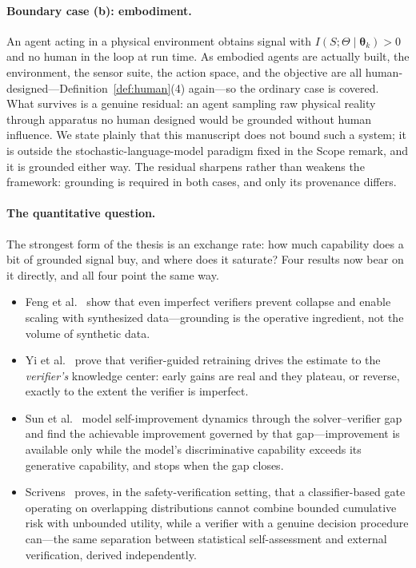 \documentclass[11pt,a4paper]{article}
\begin{document}
\paragraph{Boundary case (b): embodiment.} An agent acting in a physical environment obtains signal with $I(S;\Theta \mid \bm{\theta}_k) > 0$ and no human in the loop at run time. As embodied agents are actually built, the environment, the sensor suite, the action space, and the objective are all human-designed---Definition~\ref{def:human}(4) again---so the ordinary case is covered. What survives is a genuine residual: an agent sampling raw physical reality through apparatus no human designed would be grounded without human influence. We state plainly that this manuscript does not bound such a system; it is outside the stochastic-language-model paradigm fixed in the Scope remark, and it is grounded either way. The residual sharpens rather than weakens the framework: grounding is required in both cases, and only its provenance differs.

\paragraph{The quantitative question.} The strongest form of the thesis is an exchange rate: how much capability does a bit of grounded signal buy, and where does it saturate? Four results now bear on it directly, and all four point the same way.

\begin{itemize}
    \item Feng et al.~\cite{feng2024verification} show that even imperfect verifiers prevent collapse and enable scaling with synthesized data---grounding is the operative ingredient, not the volume of synthetic data.
    \item Yi et al.~\cite{yi2026escaping} prove that verifier-guided retraining drives the estimate to the \emph{verifier's} knowledge center: early gains are real and they plateau, or reverse, exactly to the extent the verifier is imperfect.
    \item Sun et al.~\cite{sun2025solververifier} model self-improvement dynamics through the solver--verifier gap and find the achievable improvement governed by that gap---improvement is available only while the model's discriminative capability exceeds its generative capability, and stops when the gap closes.
    \item Scrivens~\cite{scrivens2026safety} proves, in the safety-verification setting, that a classifier-based gate operating on overlapping distributions cannot combine bounded cumulative risk with unbounded utility, while a verifier with a genuine decision procedure can---the same separation between statistical self-assessment and external verification, derived independently.
\end{itemize}
\end{document}

